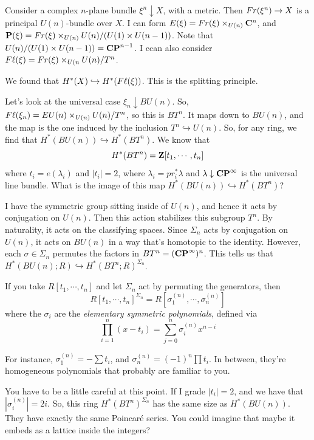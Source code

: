 Consider a complex $n$-plane bundle $\xi^n\downarrow X$, with a metric.
Then $Fr(\xi^n)\to X$ is a principal $U(n)$-bundle over $X$.
I can form $E(\xi) = Fr(\xi)\times_{U(n)}\mathbf C^n$, and $\mathbf P(\xi) = Fr(\xi)\times_{U(n)} U(n)/(U(1)\times U(n-1))$.
Note that $U(n)/(U(1)\times U(n-1)) = \mathbf{CP}^{n-1}$.
I ccan also consider $F\ell(\xi) = Fr(\xi)\times_{U(n} U(n)/T^n$.

We found that $H^\ast(X) \hookrightarrow H^\ast(F\ell(\xi))$.
This is the splitting principle.

Let's look at the universal case $\xi_n\downarrow BU(n)$.
So, $F\ell(\xi_n) = EU(n)\times_{U(n)} U(n)/T^n$, so this is $BT^n$.
It maps down to $BU(n)$, and the map is the one induced by the inclusion $T^n\hookrightarrow U(n)$.
So, for any ring, we find that $H^\ast(BU(n))\hookrightarrow H^\ast(BT^n)$.
We know that 
$$
H^\ast(BT^n) = \mathbf Z[t_1,\cdots,t_n]
$$
where $t_i = e(\lambda_i)$ and $|t_i| = 2$, where $\lambda_i = pr_i^\ast\lambda$ and $\lambda\downarrow \mathbf{CP}^\infty$ is the universal line bundle.
What is the image of this map $H^\ast(BU(n))\hookrightarrow H^\ast(BT^n)$?

I have the symmetric group sitting inside of $U(n)$, and hence it acts by conjugation on $U(n)$.
Then this action stabilizes this subgroup $T^n$.
By naturality, it acts on the classifying spaces.
Since $\Sigma_n$ acts by conjugation on $U(n)$, it acts on $BU(n)$ in a way that's homotopic to the identity.
However, each $\sigma\in \Sigma_n$ permutes the factors in $BT^n = (\mathbf{CP}^\infty)^n$.
This tells us that $H^\ast(BU(n);R) \hookrightarrow H^\ast(BT^n;R)^{\Sigma_n}$.
\begin{theorem}[Algebra]
    If you take $R[t_1,\cdots,t_n]$ and let $\Sigma_n$ act by permuting the generators, then
    $$
    R[t_1,\cdots,t_n]^{\Sigma_n} = R[\sigma_1^{(n)},\cdots,\sigma_n^{(n)}]
    $$
    where the $\sigma_i$ are the \emph{elementary symmetric polynomials}, defined via
    $$
    \prod^n_{i=1}(x-t_i) = \sum^n_{j=0} \sigma_i^{(n)}x^{n-i}
    $$
\end{theorem}
For instance, $\sigma_1^{(n)} = -\sum t_i$, and $\sigma_n^{(n)} = (-1)^n\prod t_i$.
In between, they're homogeneous polynomials that probably are familiar to you.

You have to be a little careful at this point.
If I grade $|t_i| = 2$, and we have that $|\sigma_i^{(n)}| = 2i$.
So, this ring $H^\ast(BT^n)^{\Sigma_n}$ has the same size as $H^\ast(BU(n))$.
They have exactly the same Poincar\'{e} series.
You could imagine that maybe it embeds as a lattice inside the integers?

